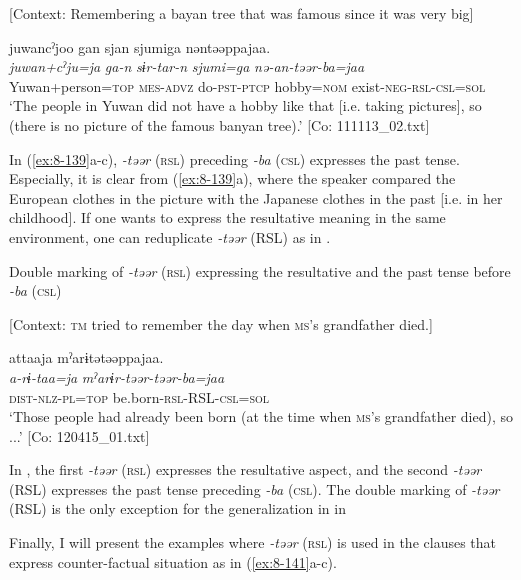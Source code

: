 \ex {}[Context: Remembering a bayan tree that was famous since it was very big]

{\TM}
\glll  juwancˀjoo  gan  sjan  {\textbar}sjumi{\textbar}ga      nəntəəppajaa.\\
\textit{juwan+cˀju=ja}  \textit{ga-n}  \textit{sɨr-tar-n}  \textit{sjumi=ga}      \textit{nə-an-təər-ba=jaa}\\
Yuwan+person=\textsc{top}  \textsc{mes}-\textsc{advz}  do-\textsc{pst}-\textsc{ptcp}  hobby=\textsc{nom} exist-\textsc{neg}-\textsc{rsl}-\textsc{csl}=\textsc{sol}\\
\glt ‘The people in Yuwan did not have a hobby like that [i.e. taking pictures], so (there is no picture of the famous banyan tree).’ [Co: 111113\_02.txt]
\z
\z

In (\ref{ex:8-139}a-c), \textit{-təər} (\textsc{rsl}) preceding \textit{-ba} (\textsc{csl}) expresses the past tense. Especially, it is clear from (\ref{ex:8-139}a), where the speaker compared the European clothes in the picture with the Japanese clothes in the past [i.e. in her childhood]. If one wants to express the resultative meaning in the same environment, one can reduplicate \textit{-təər} (RSL) as in .

\ea\label{ex:8-140}
  Double marking of \textit{-təər} (\textsc{rsl}) expressing the resultative and the past tense before \textit{-ba} (\textsc{csl})

  [Context: \textsc{tm} tried to remember the day when \textsc{ms}’s grandfather died.]

  {\TM}
\glll  attaaja  mˀarɨtətəəppajaa.\\
\textit{a-rɨ-taa=ja}  \textit{mˀarɨr-təər-təər-ba=jaa}\\
    \textsc{dist}-\textsc{nlz}-\textsc{pl}=\textsc{top}  be.born-\textsc{rsl}-RSL-\textsc{csl}=\textsc{sol}\\
\glt ‘Those people had already been born (at the time when \textsc{ms}’s grandfather died), so ...’ [Co: 120415\_01.txt]
\z

In , the first \textit{-təər} (\textsc{rsl}) expresses the resultative aspect, and the second \textit{-təər} (RSL) expresses the past tense preceding \textit{-ba} (\textsc{csl}). The double marking of \textit{-təər} (RSL) is the only exception for the generalization in  in 

  Finally, I will present the examples where \textit{-təər} (\textsc{rsl}) is used in the clauses that express counter-factual situation as in (\ref{ex:8-141}a-c).

